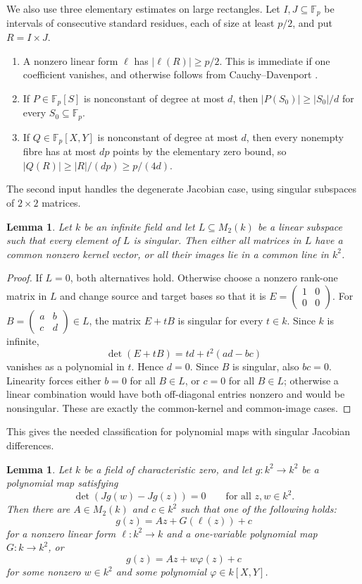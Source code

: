 \documentclass[reqno]{amsart}
\numberwithin{equation}{section}
\newtheorem{lemma}[theorem]{Lemma}
\theoremstyle{definition}
\begin{document}
We also use three elementary estimates on large rectangles.  Let
\(I,J\subseteq\mathbb F_p\) be intervals of consecutive standard residues, each
of size at least \(p/2\), and put \(R=I\times J\).
\begin{enumerate}
  \item A nonzero linear form \(\ell\) has \(|\ell(R)|\geq p/2\).  This is
  immediate if one coefficient vanishes, and otherwise follows from
  Cauchy--Davenport \cite{TaoVu2006}.
  \item If \(P\in\mathbb F_p[S]\) is nonconstant of degree at most \(d\), then
  \(|P(S_0)|\geq |S_0|/d\) for every \(S_0\subseteq\mathbb F_p\).
  \item If \(Q\in\mathbb F_p[X,Y]\) is nonconstant of degree at most \(d\), then
  every nonempty fibre has at most \(dp\) points by the elementary zero bound, so
  \(|Q(R)|\geq |R|/(dp)\geq p/(4d)\).
\end{enumerate}

The second input handles the degenerate Jacobian case, using singular subspaces
of \(2\times 2\) matrices.
\begin{lemma}
\label{lem:singular-subspaces-matrices}
Let $k$ be an infinite field and let $L\subseteq M_2(k)$ be a linear subspace
such that every element of $L$ is singular.  Then either all matrices in $L$ have
a common nonzero kernel vector, or all their images lie in a common line in
$k^2$.
\end{lemma}

\begin{proof}
If $L=0$, both alternatives hold.  Otherwise choose a nonzero rank-one matrix
in $L$ and change source and target bases so that it is $
  E=\begin{pmatrix}1&0\\0&0\end{pmatrix}$.
For $
  B=\begin{pmatrix}a&b\\ c&d\end{pmatrix}\in L$,
the matrix $E+tB$ is singular for every $t\in k$.  Since $k$ is infinite,
\[
  \det(E+tB)=td+t^2(ad-bc)
\]
vanishes as a polynomial in $t$.  Hence $d=0$.  Since $B$ is singular, also
$bc=0$.  Linearity forces either $b=0$ for all $B\in L$, or $c=0$ for all
$B\in L$; otherwise a linear combination would have both off-diagonal entries
nonzero and would be nonsingular.  These are exactly the common-kernel and
common-image cases.
\end{proof}

This gives the needed classification for polynomial maps with singular
Jacobian differences.
\begin{lemma}
\label{lem:degenerate-jacobian-classification}
Let $k$ be a field of characteristic zero, and let $g:k^2\to k^2$ be a
polynomial map satisfying
\[
  \det(Jg(w)-Jg(z))=0
  \qquad \text{for all } z,w\in k^2.
\]
Then there are $A\in M_2(k)$ and $c\in k^2$ such that one of the following holds:
\[
  g(z)=Az+G(\ell(z))+c
\]
for a nonzero linear form $\ell:k^2\to k$ and a one-variable polynomial map
$G:k\to k^2$, or
\[
  g(z)=Az+w\varphi(z)+c
\]
for some nonzero $w\in k^2$ and some polynomial $\varphi\in k[X,Y]$.
\end{lemma}
\end{document}
